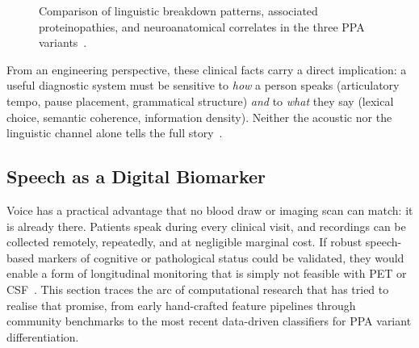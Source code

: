 \begin{figure}[H]
    \centering
    \caption[PPA variant profiles]{Comparison of linguistic breakdown patterns, associated proteinopathies, and neuroanatomical correlates in the three PPA variants~\cite{gorno2011ppa,elahi2017clinicopath}.}
    \label{fig:ppa_variants}
\end{figure}

From an engineering perspective, these clinical facts carry a direct implication: a useful diagnostic system must be sensitive to \emph{how} a person speaks (articulatory tempo, pause placement, grammatical structure) \emph{and} to \emph{what} they say (lexical choice, semantic coherence, information density).
Neither the acoustic nor the linguistic channel alone tells the full story~\cite{lima2025communicationsmedicine}.

\subsection{Speech as a Digital Biomarker}
\label{sec:sota_biomarker}

Voice has a practical advantage that no blood draw or imaging scan can match: it is already there.
Patients speak during every clinical visit, and recordings can be collected remotely, repeatedly, and at negligible marginal cost.
If robust speech-based markers of cognitive or pathological status could be validated, they would enable a form of longitudinal monitoring that is simply not feasible with PET or CSF~\cite{rezaii2025voiceprints}.
This section traces the arc of computational research that has tried to realise that promise, from early hand-crafted feature pipelines through community benchmarks to the most recent data-driven classifiers for PPA variant differentiation.

